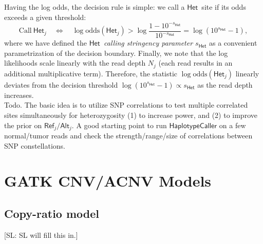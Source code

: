 \documentclass[nofootinbib,amssymb,amsmath]{revtex4}
\def\SL#1{{\color [rgb]{0,0,0.8} [SL: #1]}}
\newcommand{\HET}{$\mathsf{Het}$}
\begin{document}
Having the log odds, the decision rule is simple: we call a \HET~site if its odds exceeds a given threshold:
\begin{equation}
\mathrm{Call}~\mathsf{Het}_j \quad \Leftrightarrow \quad \log \mathrm{odds}(\mathsf{Het}_j) > \log\frac{1 - 10^{-s_\mathsf{Het}}}{10^{-s_\mathsf{Het}}} = \log(10^{s_\mathsf{Het}}-1),
\end{equation}
where we have defined the {\em \HET~calling stringency parameter $s_\mathsf{Het}$} as a convenient parametrization of the decision boundary. Finally, we note that the log likelihoods scale linearly with the read depth $N_j$ (each read results in an additional multiplicative term). Therefore, the statistic $\log \mathrm{odds}(\mathsf{Het}_j)$ linearly deviates from the decision threshold $\log(10^{s_\mathsf{Het}}-1) \propto s_\mathsf{Het}$ as the read depth increases.\\

Todo. The basic idea is to utilize SNP correlations to test multiple correlated sites simultaneously for heterozygosity (1) to increase power, and (2) to improve the prior on $\mathsf{Ref}_j/\mathsf{Alt}_j$. A good starting point to run $\mathsf{HaplotypeCaller}$ on a few normal/tumor reads and check the strength/range/size of correlations between SNP constellations.

\section{GATK CNV/ACNV Models} \label{models}

\subsection{Copy-ratio model} \label{copy-ratio-model}

\SL{SL will fill this in.}
\end{document}

